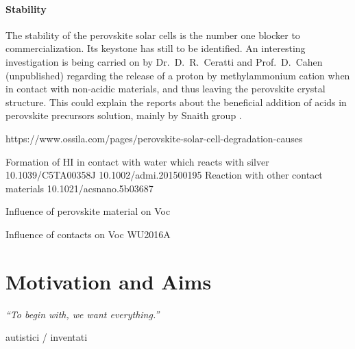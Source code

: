	\paragraph{Stability}
	The stability of the perovskite solar cells is the number one blocker to commercialization.
	Its keystone has still to be identified.
	An interesting investigation is being carried on by Dr.\ D.\ R.\ Ceratti and Prof.\ D.\ Cahen (unpublished) regarding the release of a proton by methylammonium cation when in contact with non-acidic materials, and thus leaving the perovskite crystal structure.
	This could explain the reports about the beneficial addition of acids in perovskite precursors solution, mainly by Snaith group \cite{Noel2017,Zhang2015a,Nayak2016}.


	https://www.ossila.com/pages/perovskite-solar-cell-degradation-causes


	Formation of HI in contact with water which reacts with silver 10.1039/C5TA00358J 10.1002/admi.201500195
	Reaction with other contact materials 10.1021/acsnano.5b03687

	Influence of perovskite material on Voc \cite{Wheeler2017,Eperon2014,Noh2013a}

	Influence of contacts on Voc \cite{CorreaBaena2015} WU2016A

%
%
%
%

\section{Motivation and Aims}\label{sec:aims}
\epigraph{\textit{\enquote{To begin with, we want everything.}}}{autistici / inventati}



